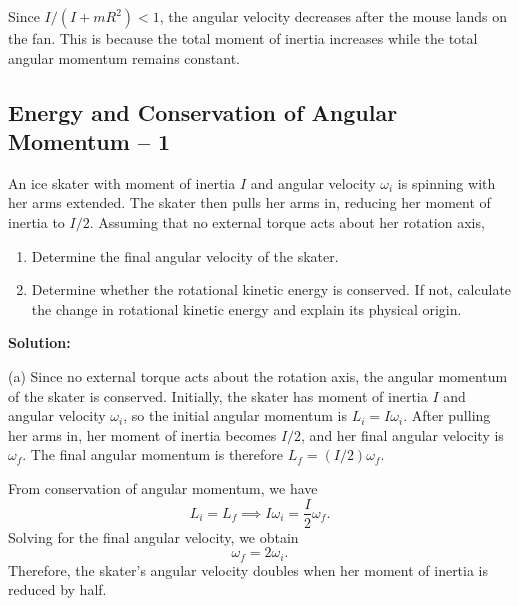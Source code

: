 \documentclass[12pt]{article}
\begin{document}
Since $I/(I+mR^2)<1$, the angular velocity decreases after the mouse lands on the fan. This is because the total moment of inertia increases while the total angular momentum remains constant.

\subsection{Energy and Conservation of Angular Momentum -- 1}

An ice skater with moment of inertia $I$ and angular velocity $\omega_i$ is spinning with her arms extended. The skater then pulls her arms in, reducing her moment of inertia to $I/2$. Assuming that no external torque acts about her rotation axis,
\begin{enumerate}
    \item[(a)] Determine the final angular velocity of the skater.
    \item[(b)] Determine whether the rotational kinetic energy
    is conserved. If not, calculate the change in rotational
    kinetic energy and explain its physical origin.
\end{enumerate}

\textbf{Solution:}

(a) Since no external torque acts about the rotation axis, the angular momentum of the skater is conserved. Initially, the skater has moment of inertia $I$ and angular velocity $\omega_i$, so the initial angular momentum is $L_i=I\omega_i$. After pulling her arms in, her moment of inertia becomes $I/2$, and her final angular velocity is $\omega_f$. The final angular momentum is therefore $L_f=(I/2)\omega_f$.

From conservation of angular momentum, we have
\begin{equation}
    L_i=L_f
    \implies I\omega_i=\frac{I}{2}\omega_f.
\end{equation}
Solving for the final angular velocity, we obtain
\begin{equation}
    \boxed{\omega_f=2\omega_i}.
\end{equation}
Therefore, the skater's angular velocity doubles when her moment of inertia is reduced by half.
\end{document}
